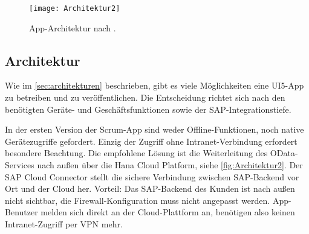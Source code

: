 \begin{figure}
	\centering
	\texttt{[image: Architektur2]} 
	\caption[App-Architektur]{App-Architektur nach \cite{openSAP2014_1}.}
	\label{fig:Architektur2}
\end{figure}

\subsection{Architektur}
\label{sec:app-architektur}
Wie im \autoref{sec:architekturen} beschrieben, gibt es viele Möglichkeiten eine UI5-App zu betreiben und zu veröffentlichen. Die Entscheidung richtet sich nach den benötigten Geräte- und Geschäftsfunktionen sowie der SAP-Integrationstiefe. 

In der ersten Version der Scrum-App sind weder Offline-Funktionen, noch native Gerätezugriffe gefordert. Einzig der Zugriff ohne Intranet-Verbindung erfordert besondere Beachtung. Die empfohlene Lösung ist die Weiterleitung des OData-Services nach außen über die Hana Cloud Platform, siehe \autoref{fig:Architektur2}. Der SAP Cloud Connector stellt die sichere Verbindung zwischen SAP-Backend vor Ort und der Cloud her. Vorteil: Das SAP-Backend des Kunden ist nach außen nicht sichtbar, die Firewall-Konfiguration muss nicht angepasst werden. App-Benutzer melden sich direkt an der Cloud-Plattform an, benötigen also keinen Intranet-Zugriff per VPN mehr.




